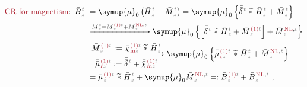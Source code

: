 \begin{subequations} \label{eq:cr-b}
\begin{align}
	\textcolor{Maroon}{\text{CR for magnetism}}\text{:}&\hspace{0.5em} \bar{B}^{\;\!\textcolor{gray}{t}}_{\;\!\textcolor{gray}{z}} \hspace{-0.7em} &&={\symup{\mu}}_0 \left( \bar{H}^{\;\!\textcolor{gray}{t}}_{\;\!\textcolor{gray}{z}} + \bar{M}^{\;\!\textcolor{gray}{t}}_{\;\!\textcolor{gray}{z}} \right) = {\symup{\mu}}_0 \left\{ \bar{\bar{\delta}}^{\;\!\textcolor{gray}{t}}~\widetilde *~\bar{H}^{\;\!\textcolor{gray}{t}}_{\;\!\textcolor{gray}{z}} + \bar{M}^{\;\!\textcolor{gray}{t}}_{\;\!\textcolor{gray}{z}} \right\} \label{cr-b1} \\ & &&\xrightarrow[]{\bar{M}^{\;\!\textcolor{gray}{t}}_{\;\!\textcolor{gray}{z}} = \bar{M}^{\;\!\textcolor{Maroon}{\text{(1)}} \textcolor{gray}{t}}_{\;\!\textcolor{gray}{z}} + \bar{M}^{\;\!\textcolor{Maroon}{\text{NL}}, \textcolor{gray}{t}}_{\;\!\textcolor{gray}{z}}} {\symup{\mu}}_0 \left\{ \left[ \bar{\bar{\delta}}^{\;\!\textcolor{gray}{t}}~\widetilde *~\bar{H}^{\;\!\textcolor{gray}{t}}_{\;\!\textcolor{gray}{z}} + \bar{M}^{\;\!\textcolor{Maroon}{\text{(1)}} \textcolor{gray}{t}}_{\;\!\textcolor{gray}{z}} \right] + \bar{M}^{\;\!\textcolor{Maroon}{\text{NL}}, \textcolor{gray}{t}}_{\;\!\textcolor{gray}{z}} \right\} \label{cr-b2} \\ & &&\xrightarrow[\displaystyle{ \bar{\bar{\mu}}^{\;\!\textcolor{Maroon}{\text{(1)}} \textcolor{gray}{t}}_{\;\!\textcolor{Maroon}{\text{r}}\textcolor{gray}{z}} := \bar{\bar{\delta}}^{\;\!\textcolor{gray}{t}} + \bar{\bar{\chi}}^{\;\!\textcolor{Maroon}{\text{(1)}}\textcolor{gray}{t}}_{\;\!\textcolor{Maroon}{\text{m}} \textcolor{gray}{z}}}]{\displaystyle{\bar{M}^{\;\!\textcolor{Maroon}{\text{(1)}} \textcolor{gray}{t}}_{\;\!\textcolor{gray}{z}} := \bar{\bar{\chi}}^{\;\!\textcolor{Maroon}{\text{(1)}}\textcolor{gray}{t}}_{\;\!\textcolor{Maroon}{\text{m}} \textcolor{gray}{z}} ~\widetilde *~\bar{H}^{\;\!\textcolor{gray}{t}}_{\;\!\textcolor{gray}{z}}}} {\symup{\mu}}_0 \left\{ \bar{\bar{\mu}}^{\;\!\textcolor{Maroon}{\text{(1)}} \textcolor{gray}{t}}_{\;\!\textcolor{Maroon}{\text{r}}\textcolor{gray}{z}}~\widetilde *~\bar{H}^{\;\!\textcolor{gray}{t}}_{\;\!\textcolor{gray}{z}} + \bar{M}^{\;\!\textcolor{Maroon}{\text{NL}}, \textcolor{gray}{t}}_{\;\!\textcolor{gray}{z}} \right\} \label{cr-b3} \\ & &&= \bar{\bar{\mu}}^{\;\!\textcolor{Maroon}{\text{(1)}} \textcolor{gray}{t}}_{\;\!\textcolor{gray}{z}}~\widetilde *~\bar{H}^{\;\!\textcolor{gray}{t}}_{\;\!\textcolor{gray}{z}} + {\symup{\mu}}_0 \bar{M}^{\;\!\textcolor{Maroon}{\text{NL}}, \textcolor{gray}{t}}_{\;\!\textcolor{gray}{z}} =: \bar{B}^{\;\!\textcolor{Maroon}{\text{(1)}} \textcolor{gray}{t}}_{\;\!\textcolor{gray}{z}} + \bar{B}^{\;\!\textcolor{Maroon}{\text{NL}}, \textcolor{gray}{t}}_{\;\!\textcolor{gray}{z}}~, \label{cr-b4}
\end{align}
\end{subequations}
